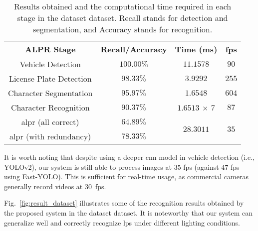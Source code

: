 \begin{table}[!htb]
	\centering
	\caption{Results obtained and the computational time required in each stage in the \acrshort*{dataset} dataset. Recall stands for detection and segmentation, and Accuracy stands for recognition.}
	\label{tab:dataset_fps}
	\begin{tabular}{@{}cccc@{}}
		\toprule
		ALPR Stage & Recall/Accuracy & Time (ms) & \gls*{fps} \\ \midrule
		Vehicle Detection & $100.00\%$ & $11.1578$ & $90$ \\
		License Plate Detection & $98.33\%$ & $3.9292$ & $255$ \\
		Character Segmentation & $95.97\%$ & $1.6548$ & $604$ \\
		Character Recognition & $90.37\%$ & $1.6513$ $\times$ $7$ & $87$ \\ \midrule 
		\gls*{alpr} (all correct) & $64.89\%$& \multirow{2}{*}{$28.3011$} & \multirow{2}{*}{$35$} \\
		\gls*{alpr} (with redundancy) & $78.33\%$& & \\ \bottomrule
	\end{tabular}
\end{table}

It is worth noting that despite using a deeper \gls*{cnn} model in vehicle detection (i.e., YOLOv2), our system is still able to process images at $35$ \gls*{fps} (against $47$ \gls*{fps} using Fast-YOLO).  
This is sufficient for real-time usage, as commercial cameras generally record videos at $30$~\gls*{fps}.

Fig.~\ref{fig:result_dataset} illustrates some of the recognition results obtained by the proposed system in the \acrshort*{dataset} dataset. It is noteworthy that our system can generalize well and correctly recognize \glspl*{lp} under different lighting conditions. 

